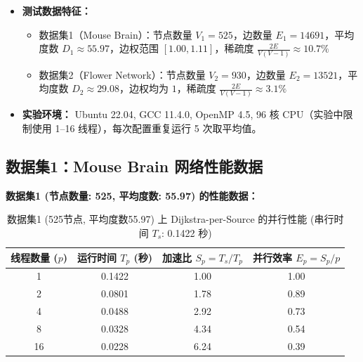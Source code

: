 \documentclass{SYSUReport}
\begin{document}
\begin{itemize}
\begin{itemize}
\begin{itemize}
                \item \textit{向量化}：最内层 $j$ 循环使用 \texttt{\#pragma omp simd} 提示编译器进行 SIMD 自动向量化，利用 AVX/SSE 指令同时处理多个目标节点。
                \item \textit{提前剪枝}：利用稀疏图特性，若 $\texttt{dist}[i][k]$ 为 INF（即尚无 $i \rightarrow k$ 的路径），直接跳过整个 $j$ 循环，避免无效计算。
                \item \textit{同步开销}：每次 $k$ 迭代结束时进行一次隐式 barrier 同步，总计 $V$ 次 fork/join 操作，这是 FW 并行效率低于 Dijkstra 的根本原因。
            \end{itemize}
        \end{itemize}
    \item \textbf{测试数据特征：}
        \begin{itemize}
            \item 数据集1（Mouse Brain）：节点数量 $V_1 = 525$，边数量 $E_1 = 14691$，平均度数 $D_1 \approx 55.97$，边权范围 $[1.00, 1.11]$，稀疏度 $\frac{2E}{V(V-1)} \approx 10.7\%$
            \item 数据集2（Flower Network）：节点数量 $V_2 = 930$，边数量 $E_2 = 13521$，平均度数 $D_2 \approx 29.08$，边权均为 $1$，稀疏度 $\frac{2E}{V(V-1)} \approx 3.1\%$
        \end{itemize}
    \item \textbf{实验环境：} Ubuntu 22.04, GCC 11.4.0, OpenMP 4.5, 96 核 CPU（实验中限制使用 1--16 线程），每次配置重复运行 5 次取平均值。
\end{itemize}

\subsection{数据集1：Mouse Brain 网络性能数据}

\textbf{数据集1 (节点数量: 525, 平均度数: 55.97) 的性能数据：}

\begin{table}[H]
  \centering
  \caption{数据集1 (525节点, 平均度数55.97) 上 Dijkstra-per-Source 的并行性能 (串行时间 $T_s$: 0.1422 秒)}
  \label{tab:results_mouse_dijkstra}
  \begin{tabular}{cccc}
    \toprule
    \textbf{线程数量 ($p$)} & \textbf{运行时间 $T_p$ (秒)} & \textbf{加速比 $S_p = T_s / T_p$} & \textbf{并行效率 $E_p = S_p / p$} \\
    \midrule
    1   & 0.1422 & 1.00 & 1.00 \\
    2   & 0.0801 & 1.78 & 0.89 \\
    4   & 0.0488 & 2.92 & 0.73 \\
    8   & 0.0328 & 4.34 & 0.54 \\
    16  & 0.0228 & 6.24 & 0.39 \\
    \bottomrule
  \end{tabular}
\end{table}
\end{document}
